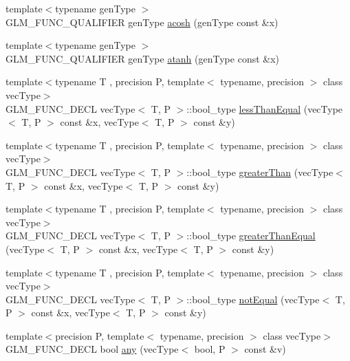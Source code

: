 \begin{DoxyCompactItemize}
\item 
{\footnotesize template$<$typename gen\+Type $>$ }\\G\+L\+M\+\_\+\+F\+U\+N\+C\+\_\+\+Q\+U\+A\+L\+I\+F\+I\+ER gen\+Type \hyperlink{group__core__func__trigonometric_ga961d72b4a20d09d6e71fdf076ad4f433}{acosh} (gen\+Type const \&x)
\item 
{\footnotesize template$<$typename gen\+Type $>$ }\\G\+L\+M\+\_\+\+F\+U\+N\+C\+\_\+\+Q\+U\+A\+L\+I\+F\+I\+ER gen\+Type \hyperlink{group__core__func__trigonometric_gaa20b78cb9c12e30bd5a3054b8cb3d099}{atanh} (gen\+Type const \&x)
\item 
{\footnotesize template$<$typename T , precision P, template$<$ typename, precision $>$ class vec\+Type$>$ }\\G\+L\+M\+\_\+\+F\+U\+N\+C\+\_\+\+D\+E\+CL vec\+Type$<$ T, P $>$\+::bool\+\_\+type \hyperlink{group__core__func__vector__relational_ga2167b22ac086c5791a4740932b62b685}{less\+Than\+Equal} (vec\+Type$<$ T, P $>$ const \&x, vec\+Type$<$ T, P $>$ const \&y)
\item 
{\footnotesize template$<$typename T , precision P, template$<$ typename, precision $>$ class vec\+Type$>$ }\\G\+L\+M\+\_\+\+F\+U\+N\+C\+\_\+\+D\+E\+CL vec\+Type$<$ T, P $>$\+::bool\+\_\+type \hyperlink{group__core__func__vector__relational_gac9163d451231eb3eaae2c6b3da5add6a}{greater\+Than} (vec\+Type$<$ T, P $>$ const \&x, vec\+Type$<$ T, P $>$ const \&y)
\item 
{\footnotesize template$<$typename T , precision P, template$<$ typename, precision $>$ class vec\+Type$>$ }\\G\+L\+M\+\_\+\+F\+U\+N\+C\+\_\+\+D\+E\+CL vec\+Type$<$ T, P $>$\+::bool\+\_\+type \hyperlink{group__core__func__vector__relational_gad1385064aa2fc7aaae37aa95daea9c31}{greater\+Than\+Equal} (vec\+Type$<$ T, P $>$ const \&x, vec\+Type$<$ T, P $>$ const \&y)
\item 
{\footnotesize template$<$typename T , precision P, template$<$ typename, precision $>$ class vec\+Type$>$ }\\G\+L\+M\+\_\+\+F\+U\+N\+C\+\_\+\+D\+E\+CL vec\+Type$<$ T, P $>$\+::bool\+\_\+type \hyperlink{group__core__func__vector__relational_ga85d7bc5613c4dcc2d5873ec9d6ed4c19}{not\+Equal} (vec\+Type$<$ T, P $>$ const \&x, vec\+Type$<$ T, P $>$ const \&y)
\item 
{\footnotesize template$<$precision P, template$<$ typename, precision $>$ class vec\+Type$>$ }\\G\+L\+M\+\_\+\+F\+U\+N\+C\+\_\+\+D\+E\+CL bool \hyperlink{group__core__func__vector__relational_ga632a2644532d9332011c8860400d30b2}{any} (vec\+Type$<$ bool, P $>$ const \&v)

\end{DoxyCompactItemize}
